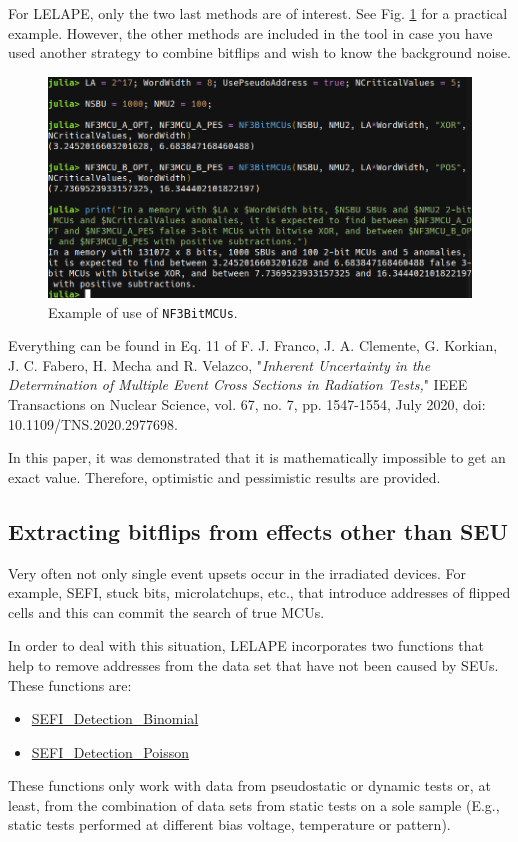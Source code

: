 \begin{itemize}
	For LELAPE, only the two last methods are of interest. See Fig. \ref{fig:Example_NF3BitMCUs} for a practical example. However, the other methods are included in the tool in case you have used another strategy to combine bitflips and wish to know the background noise.
	
	\begin{figure}[h!]
		\centering
		\includegraphics[width=0.75\columnwidth]{fig/functions/NF3BitMCUs.png}
		\caption{Example of use of \texttt{NF3BitMCUs}.}
		\label{fig:Example_NF3BitMCUs}
	\end{figure}	
	
	
	Everything can be found in Eq. 11 of F. J. Franco, J. A. Clemente, G. Korkian, 
	J. C. Fabero, H. Mecha and R. Velazco, "\textit{Inherent Uncertainty in the Determination of Multiple 
		Event Cross Sections in Radiation Tests,}" IEEE Transactions on Nuclear Science, vol. 67, no. 7, 
	pp. 1547-1554, July 2020, doi: 10.1109/TNS.2020.2977698.
	
	In this paper, it was demonstrated that it is mathematically impossible to get an exact value. Therefore,  optimistic and pessimistic results are provided.
\end{itemize}

\subsection{Extracting bitflips from effects other than SEU}\label{subsec:ExtractingBitflipsFromSEFI}
Very often not only single event upsets occur in the irradiated devices. For example, SEFI, stuck bits, microlatchups, etc., that introduce addresses of flipped cells and this can commit the search of true MCUs.

In order to deal with this situation, LELAPE incorporates two functions that help to remove addresses from the data set that have not been caused by SEUs. These functions are:
\begin{itemize}
	\item \hyperref[Fun:SEFI_Detection_Binomial]{SEFI\_Detection\_Binomial}
	\item \hyperref[Fun:SEFI_Detection_Poisson]{SEFI\_Detection\_Poisson}
\end{itemize}
These functions only work with data from pseudostatic or dynamic tests or, at least, from the combination of data sets from static tests on a sole sample (E.g., static tests performed at different bias voltage, temperature or pattern).

